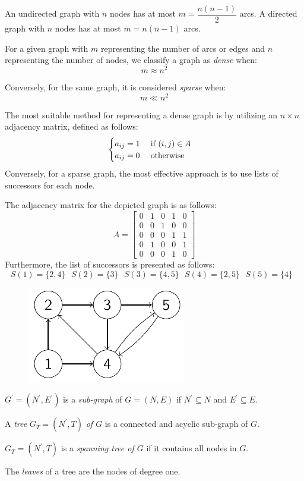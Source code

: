 An undirected graph with $n$ nodes has at most $m=\dfrac{n(n-1)}{2}$ arcs. 
A directed graph with $n$ nodes has at most $m=n(n-1)$ arcs.
\newpage
\begin{definition}
    For a given graph with $m$ representing the number of arcs or edges and $n$ representing the number of nodes, we classify a graph as \emph{dense} when:
    \[m \approx n^2\]

    Conversely, for the same graph, it is considered \emph{sparse} when:
    \[m \ll n^2\]
\end{definition}
The most suitable method for representing a dense graph is by utilizing an $n \times n$ adjacency matrix, defined as follows:
\[
\begin{cases}
    a_{ij}=1 \:\:\:\:\:\: \textnormal{if }(i,j) \in A \\
    a_{ij}=0 \:\:\:\:\:\: \textnormal{otherwise}    
\end{cases}    
\]
Conversely, for a sparse graph, the most effective approach is to use lists of successors for each node.
\begin{example}
    The adjacency matrix for the depicted graph is as follows:
    \[A=\begin{bmatrix}
        0 & 1 & 0 & 1 & 0 \\
        0 & 0 & 1 & 0 & 0 \\
        0 & 0 & 0 & 1 & 1 \\
        0 & 1 & 0 & 0 & 1 \\
        0 & 0 & 0 & 1 & 0 
        \end{bmatrix}\]
    Furthermore, the list of successors is presented as follows:
    \[S(1)=\{2,4\} \:\:\: S(2)=\{3\} \:\:\:S(3)=\{4,5\} \:\:\: S(4)=\{2,5\} \:\:\: S(5)=\{4\} \:\:\:\]
    \begin{figure}[H]
        \centering
        \includegraphics[width=0.3\linewidth]{images/graphs.png}
    \end{figure}
\end{example}
\begin{definition}
    $G^{'}=(N^{'},E^{'})$ is a \emph{sub-graph} of $G=(N,E)$ if $N^{'} \subseteq N$ and $E^{'} \subseteq E$. 

    A \emph{tree} $G_T=(N^{'},T)$ \emph{of $G$} is a connected and acyclic sub-graph of $G$. 

    $G_T=(N^{'},T)$ is a \emph{spanning tree of $G$} if it contains all nodes in $G$. 

    The \emph{leaves} of a tree are the nodes of degree one. 
\end{definition}
